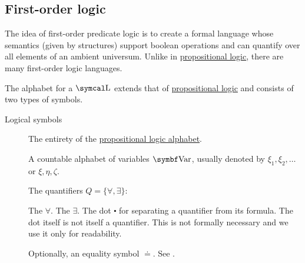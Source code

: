 \subsection{First-order logic}\label{subsec:first_order_logic}

\begin{definition}\label{def:first_order_logic_alphabet}
  The idea of first-order predicate logic is to create a formal language whose semantics (given by structures) support boolean operations and can quantify over all elements of an ambient universum. Unlike in \hyperref[subsec:propositional_logic]{propositional logic}, there are many first-order logic languages.

  The alphabet for a  \( \CL \) extends that of \hyperref[subsec:propositional_logic]{propositional logic} and consists of two types of symbols.

  \begin{description}
    \item[Logical symbols]\mbox{}
    \begin{DefEnum}[series=def:first_order_logic_alphabet]
       The entirety of the \hyperref[subsec:propositional_logic]{propositional logic alphabet}.

       A countable alphabet of variables \( \Bold{Var} \), usually denoted by \( \xi_1, \xi_2, \ldots \) or \( \xi, \eta, \zeta \).

       The quantifiers \( Q = \{ \forall, \exists \} \):
      \begin{DefEnum}
         The  \( \forall \).
         The  \( \exists \).
         The dot \( \centerdot \) for separating a quantifier from its formula. The dot itself is not itself a quantifier. This is not formally necessary and we use it only for readability.
      \end{DefEnum}

       Optionally, an equality symbol \( \doteq \). See .
    \end{DefEnum}


\end{description}
\end{definition}
